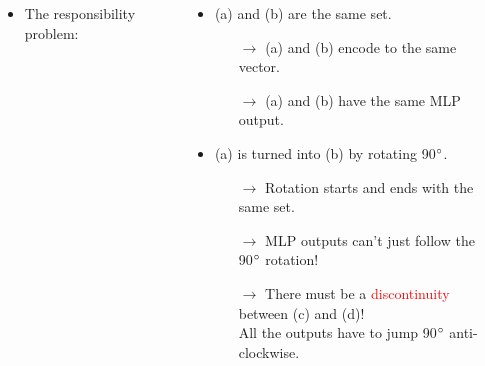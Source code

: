 \documentclass[a0paper, landscape, 25pt]{tikzposter}
\begin{document}
\begin{columns}
{            \vspace{0.5cm}
            \begin{center}
            \end{center}

            \vspace{0.5cm}
            \begin{itemize}
                \item The responsibility problem:
            \end{itemize}
            \begin{center}
                \hspace*{5mm}
            \end{center}
            \vspace{0.5cm}

            \begin{itemize}
                \item \textcolor{colorTwo}{(a)} and \textcolor{colorTwo}{(b)} are the same set.
                \begin{itemize}
                    \item[$\rightarrow$] \textcolor{colorTwo}{(a)} and \textcolor{colorTwo}{(b)} encode to the same vector.
                    \item[$\rightarrow$] \textcolor{colorTwo}{(a)} and \textcolor{colorTwo}{(b)} have the same MLP output.
                \end{itemize}
                \item \textcolor{colorTwo}{(a)} is turned into \textcolor{colorTwo}{(b)} by rotating 90$\degree$.
                \begin{itemize}
                    \item[$\rightarrow$] Rotation starts and ends with the same set.
                    \item[$\rightarrow$] MLP outputs can't just follow the 90$\degree$ rotation!
                    \item[$\rightarrow$] There must be a \textcolor{red}{discontinuity} between \textcolor{colorTwo}{(c)} and \textcolor{colorTwo}{(d)}!\\
                    All the outputs have to jump 90$\degree$ anti-clockwise.
                \end{itemize}
            \end{itemize}

}
\end{columns}
\end{document}
